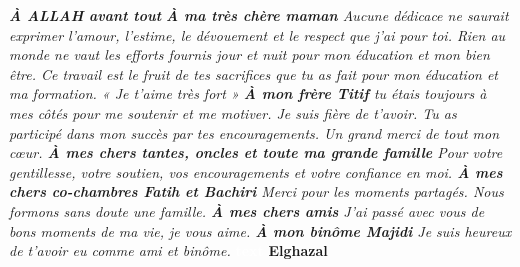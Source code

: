 \thispagestyle{plain}
\begin{large}
\begin{center}
\centering

\noindent\textit{
    \textbf{À ALLAH avant tout}
    \newline
    \textbf{À ma très chère maman}
    \newline
    Aucune dédicace ne saurait exprimer l'amour, l'estime, le dévouement et le
    respect que j'ai pour toi.
    \newline
    Rien au monde ne vaut les efforts fournis jour et nuit pour mon éducation et
    mon bien être.
    \newline
    Ce travail est le fruit de tes sacrifices que tu as fait pour mon éducation et ma formation.
    « Je t'aime très fort »
    \newline
    \newline
    \textbf{À mon frère Titif}
    \newline
    tu étais toujours à mes côtés pour me soutenir et me motiver. Je suis fière de t'avoir.
    \newline
    Tu as participé dans mon succès par tes encouragements. Un grand merci de tout mon cœur.
    \newline
    \newline
    \newline
    \textbf{À mes chers tantes, oncles et toute ma grande famille}
    \newline
    Pour votre gentillesse, votre soutien, vos encouragements et votre confiance en moi.
    \newline
    \newline
    \textbf{À mes chers co-chambres Fatih et Bachiri}
    \newline
    Merci pour les moments partagés. Nous formons sans doute une famille. 
    \newline
    \newline
    \textbf{À mes chers amis}
    \newline
    J'ai passé avec vous de bons moments de ma vie, je vous aime.
    \newline
    \newline
    \textbf{À mon binôme Majidi}
    \newline
    Je suis heureux de t'avoir eu comme ami et binôme.
    \newline
}
\newline
\raggedleft\textbf{\textcolor{white}{text}}
\hfill \textbf{Elghazal}
\end{center}
\end{large}